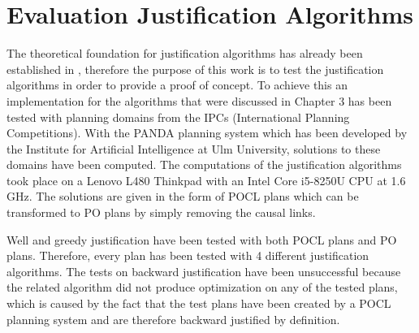 \chapter{Evaluation Justification Algorithms}

The theoretical foundation for justification algorithms has already been established in \cite{Justification},
therefore the purpose of this work is to test the justification algorithms in order to provide a proof of concept. 
To achieve this an implementation for the algorithms that were discussed in Chapter 3 
has been tested with planning domains from the IPCs (International Planning Competitions). With the PANDA \cite{Panda} planning
system which has been developed by the Institute for Artificial Intelligence at Ulm University, solutions to 
these domains have been computed.
The computations of the justification algorithms took place on a Lenovo L480 Thinkpad with an Intel Core i5-8250U CPU at 1.6 GHz.
The solutions are given in the form of POCL plans which can be transformed to PO plans by simply removing the causal links.

Well and greedy justification have been tested with both POCL plans 
and PO plans. Therefore, every plan has been tested with 4 different 
justification algorithms. The tests on backward justification 
have been unsuccessful because the related algorithm
did not produce optimization on any of the tested plans,
which is caused by the fact that the test plans have been created by a
POCL planning system and are therefore backward justified by definition.  


